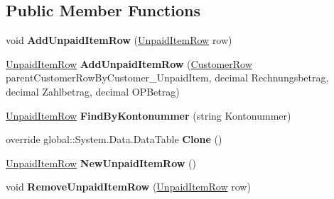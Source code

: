\subsection*{Public Member Functions}
\begin{DoxyCompactItemize}
\item 
void {\bfseries Add\+Unpaid\+Item\+Row} (\hyperlink{class_products_1_1_data_1_1ds_sage_1_1_unpaid_item_row}{Unpaid\+Item\+Row} row)\hypertarget{class_products_1_1_data_1_1ds_sage_1_1_unpaid_item_data_table_a92f9d8e4dd6435618ab926838b4e21bb}{}\label{class_products_1_1_data_1_1ds_sage_1_1_unpaid_item_data_table_a92f9d8e4dd6435618ab926838b4e21bb}

\item 
\hyperlink{class_products_1_1_data_1_1ds_sage_1_1_unpaid_item_row}{Unpaid\+Item\+Row} {\bfseries Add\+Unpaid\+Item\+Row} (\hyperlink{class_products_1_1_data_1_1ds_sage_1_1_customer_row}{Customer\+Row} parent\+Customer\+Row\+By\+Customer\+\_\+\+Unpaid\+Item, decimal Rechnungsbetrag, decimal Zahlbetrag, decimal O\+P\+Betrag)\hypertarget{class_products_1_1_data_1_1ds_sage_1_1_unpaid_item_data_table_ab5cd100fe387b9b1fd542f8a6073759d}{}\label{class_products_1_1_data_1_1ds_sage_1_1_unpaid_item_data_table_ab5cd100fe387b9b1fd542f8a6073759d}

\item 
\hyperlink{class_products_1_1_data_1_1ds_sage_1_1_unpaid_item_row}{Unpaid\+Item\+Row} {\bfseries Find\+By\+Kontonummer} (string Kontonummer)\hypertarget{class_products_1_1_data_1_1ds_sage_1_1_unpaid_item_data_table_a4565913605b1149846a7532a2294ebb4}{}\label{class_products_1_1_data_1_1ds_sage_1_1_unpaid_item_data_table_a4565913605b1149846a7532a2294ebb4}

\item 
override global\+::\+System.\+Data.\+Data\+Table {\bfseries Clone} ()\hypertarget{class_products_1_1_data_1_1ds_sage_1_1_unpaid_item_data_table_a0a2f21cb53529df63626c9a25eb0e4e6}{}\label{class_products_1_1_data_1_1ds_sage_1_1_unpaid_item_data_table_a0a2f21cb53529df63626c9a25eb0e4e6}

\item 
\hyperlink{class_products_1_1_data_1_1ds_sage_1_1_unpaid_item_row}{Unpaid\+Item\+Row} {\bfseries New\+Unpaid\+Item\+Row} ()\hypertarget{class_products_1_1_data_1_1ds_sage_1_1_unpaid_item_data_table_a3d8e8fcc1c9f6da2be41d3d65224b610}{}\label{class_products_1_1_data_1_1ds_sage_1_1_unpaid_item_data_table_a3d8e8fcc1c9f6da2be41d3d65224b610}

\item 
void {\bfseries Remove\+Unpaid\+Item\+Row} (\hyperlink{class_products_1_1_data_1_1ds_sage_1_1_unpaid_item_row}{Unpaid\+Item\+Row} row)\hypertarget{class_products_1_1_data_1_1ds_sage_1_1_unpaid_item_data_table_a8fe08d377fe26b28d3a6020a3f321d72}{}\label{class_products_1_1_data_1_1ds_sage_1_1_unpaid_item_data_table_a8fe08d377fe26b28d3a6020a3f321d72}

\end{DoxyCompactItemize}
